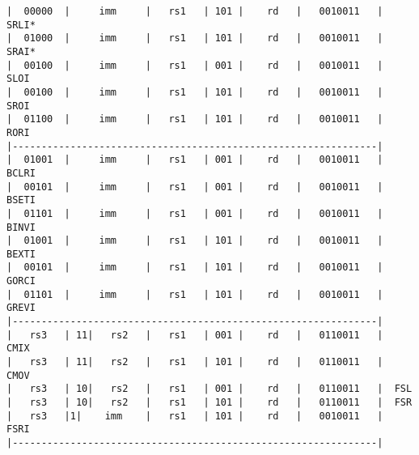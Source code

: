 \begin{minipage}{\linewidth}
\begin{verbatim}
|  00000  |     imm     |   rs1   | 101 |    rd   |   0010011   |  SRLI*
|  01000  |     imm     |   rs1   | 101 |    rd   |   0010011   |  SRAI*
|  00100  |     imm     |   rs1   | 001 |    rd   |   0010011   |  SLOI
|  00100  |     imm     |   rs1   | 101 |    rd   |   0010011   |  SROI
|  01100  |     imm     |   rs1   | 101 |    rd   |   0010011   |  RORI
|---------------------------------------------------------------|
|  01001  |     imm     |   rs1   | 001 |    rd   |   0010011   |  BCLRI
|  00101  |     imm     |   rs1   | 001 |    rd   |   0010011   |  BSETI
|  01101  |     imm     |   rs1   | 001 |    rd   |   0010011   |  BINVI
|  01001  |     imm     |   rs1   | 101 |    rd   |   0010011   |  BEXTI
|  00101  |     imm     |   rs1   | 101 |    rd   |   0010011   |  GORCI
|  01101  |     imm     |   rs1   | 101 |    rd   |   0010011   |  GREVI
|---------------------------------------------------------------|
|   rs3   | 11|   rs2   |   rs1   | 001 |    rd   |   0110011   |  CMIX
|   rs3   | 11|   rs2   |   rs1   | 101 |    rd   |   0110011   |  CMOV
|   rs3   | 10|   rs2   |   rs1   | 001 |    rd   |   0110011   |  FSL
|   rs3   | 10|   rs2   |   rs1   | 101 |    rd   |   0110011   |  FSR
|   rs3   |1|    imm    |   rs1   | 101 |    rd   |   0010011   |  FSRI
|---------------------------------------------------------------|
\end{verbatim}
\end{minipage}

